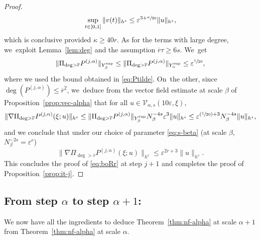 \documentclass[JEP,XML,SOM,Unicode,published]{cedram}
\newcommand{\Psfrac}[2]{(\sfrac{#1}{#2})}
\theoremstyle{plain}
\theoremstyle{definition}
\newcommand{\1}{\mathbf{1}}
\newcommand{\Ysup}[1]{Y_{#1}^{\mathrm{sup}}}
\let\epsilon\varepsilon
\begin{document}
\begin{proof}
\begin{align*}
\sup_{t\in[0,1]}\|v(t)\|_{h^{s}}
\leq\epsilon^{3+\sfrac{\kappa}{20}}\|u\|_{h^{s}},
\end{align*}
which is conclusive provided $\kappa\geq 40r$. As for the terms with large degree, we~exploit Lemma~\ref{lem:deg} and the assumption $\overline{r}\tau\geq 6s$. We~get
\[
\|
\Pi_{\deg>\overline{r}}P^{(j,\alpha)}\|_{\Ysup{\beta}}
\leq
\|\Pi_{\deg>\overline{r}}P^{(j,\alpha)}
\|_{\Ysup{\alpha}}
\leq
\epsilon^{\sfrac{1}{20}},
\]
where we used the bound obtained in \eqref{eq:Ptilde}. On~the other, since $\deg(P^{(j,\alpha)})\leq\overline{r}^{2}$, we~deduce from the vector field estimate at scale $\beta$ of Proposition~\ref{prop:vec-alpha} that for all $u\in\mathcal{V}_{\alpha,s}(10\epsilon,\xi)$,
\[
\|\nabla \Pi_{\deg>\overline{r}}P^{(j,\alpha)}(\xi;u)\|_{h^{s}}
\leq \|\Pi_{\deg>\overline{r}}P^{(j,\alpha)}\|_{\Ysup{\beta}}
N_{\beta}^{-4s}\epsilon^{3}\|u\|_{h^{s}}
\leq
\epsilon^{\Psfrac{1}{20}+3}N_{\beta}^{-4s}\|u\|_{h^{s}},
\]
and we conclude that under our choice of parameter \eqref{eq:s-beta} (at scale $\beta$, $N_{\beta}^{-2s}=\epsilon^{r}$)
\[
\|\nabla \Pi_{\deg>\overline{r}}P^{(j,\alpha)}(\xi;u)\|_{h^{s}}
\leq
\epsilon^{2r+3}\|u\|_{h^{s}}.
\]
This concludes the proof of \eqref{eq:boRr} at step $j+1$ and completes the proof of Proposition~\ref{prop:it-j}.
\end{proof}

\subsection{From step $\alpha$ to step $\alpha+1$:}
\label{sec:+1}
We now have all the ingredients to deduce Theorem~\ref{thm:nf-alpha} at scale $\alpha+1$ from Theorem~\ref{thm:nf-alpha} at scale $\alpha$.
\end{document}
